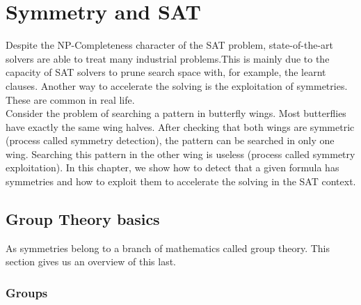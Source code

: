 \chapter{Symmetry and SAT}\label{chap:symmetryinsat}
\minitoc
Despite the NP-Completeness character of the SAT problem, state-of-the-art solvers are able to treat many industrial problems.This is mainly due to the capacity of SAT solvers to prune search space with, for example, the learnt clauses.
Another way to accelerate the solving is the exploitation of symmetries.
These are common in real life. \\
Consider the problem of searching a pattern in butterfly wings.
Most butterflies have exactly the same wing halves. After checking that both wings are symmetric
(process called symmetry detection), the pattern can be searched in only one wing. Searching this pattern in the other wing is useless (process called symmetry exploitation). 
In this chapter, we show how to detect that a given formula has symmetries and how to
exploit them to accelerate the solving in the SAT context.

\section{Group Theory basics} 
As symmetries belong to a branch of mathematics called group theory.
This section gives us an overview of this last.
\subsection{Groups}

